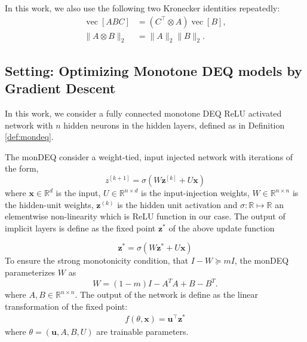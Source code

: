 \documentclass[twoside]{article}
\DeclareMathOperator{\vecop}{vec}
\begin{document}
In this work, we also use the following two Kronecker identities repeatedly:
\begin{align}
  \vecop[ABC] &= (C^\top \otimes A)\vecop[B], \tag{K1}\label{eq:K1}\\
  \|A \otimes B\|_2 &= \|A\|_2\|B\|_2. \tag{K2}\label{eq:K2}
\end{align}


\subsection{Setting: Optimizing Monotone DEQ models by Gradient Descent}
In this work, we consider a fully connected monotone DEQ ReLU activated network with $n$ hidden neurons in the hidden layers, defined as in Definition \ref{def:mondeq}.

\begin{definition}
\label{def:mondeq}
The monDEQ consider a weight-tied, input injected network with iterations of the form,
\begin{equation}
    z^{[k+1]}=\sigma\left(W \mathbf{z}^{[k]}+U \mathbf{x} \right)
\end{equation}
where $\mathbf{x} \in \mathbb{R}^d$ is the input, $U \in \mathbb{R}^{n \times d}$ is the input-injection weights, $W \in \mathbb{R}^{n \times n}$ is the hidden-unit weights, $\mathbf{z}^{(k)}$ is the hidden unit activation and $\sigma: \mathbb{R} \mapsto \mathbb{R}$ an elementwise non-linearity which is ReLU function in our case.
The output of implicit layers is define as the fixed point $\mathbf{z}^*$ of the above update function

\begin{equation}
    \mathbf{z}^*=\sigma\left(W \mathbf{z}^*+U \mathbf{x}\right)
\end{equation}
To ensure the strong monotonicity condition, that $I - W \succeq mI$, the monDEQ parameterizes $W$ as
\begin{equation}
    W=(1-m) I-A^{T} A+B-B^{T} .
\end{equation}
where $A, B \in \mathbb{R}^{n \times n}$.
The output of the network is define as the linear transformation of the fixed point:
\begin{align*}
    f(\theta, \mathbf{x}) = \mathbf{u}^\top \mathbf{z}^{*}
\end{align*}
where $\theta = (\mathbf{u}, A, B, U)$ are trainable parameters.
\end{definition}

\end{document}
